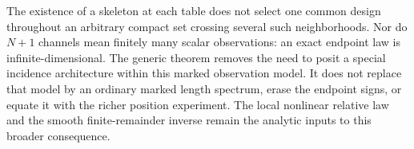 The existence of a skeleton at each table does not select one common design
throughout an arbitrary compact set crossing several such neighborhoods.
Nor do $N+1$ channels mean finitely many scalar observations: an exact
endpoint law is infinite-dimensional.  The generic theorem removes the
need to posit a special incidence architecture within this marked
observation model.  It does not replace that model by an ordinary marked
length spectrum, erase the endpoint signs, or equate it with the richer
position experiment.  The local nonlinear relative law and the smooth
finite-remainder inverse remain the analytic inputs to this broader
consequence.
